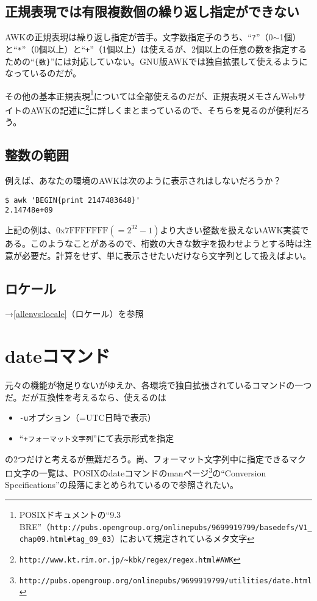 \subsection*{正規表現では有限複数個の繰り返し指定ができない}

AWKの正規表現は繰り返し指定が苦手。文字数指定子のうち、``\verb|?|''（0$\sim$1個）と``\verb|*|''（0個以上）と``\verb|+|''（1個以上）は使えるが、2個以上の任意の数を指定するための``\verb|{数}|''には対応していない。GNU版AWKでは独自拡張して使えるようになっているのだが。

その他の基本正規表現\footnote{POSIXドキュメントの``9.3 BRE''（\verb|http://pubs.opengroup.org/onlinepubs/9699919799/basedefs/V1_chap09.html#tag_09_03|）において規定されているメタ文字}については全部使えるのだが、正規表現メモさんWebサイトのAWKの記述に\footnote{\verb|http://www.kt.rim.or.jp/~kbk/regex/regex.html#AWK|}に詳しくまとまっているので、そちらを見るのが便利だろう。

\subsection*{整数の範囲}

例えば、あなたの環境のAWKは次のように表示されはしないだろうか？

\begin{screen}
	\verb|$ awk 'BEGIN{print 2147483648}'| \return \\
	\verb|2.14748e+09| 
\end{screen}

上記の例は、$\mathrm{0x7FFFFFFF}(=2^{32}-1)$より大きい整数を扱えないAWK実装である。このようなことがあるので、桁数の大きな数字を扱わせようとする時は注意が必要だ。計算をせず、単に表示させたいだけなら文字列として扱えばよい。

\subsection*{ロケール}

\noindent
→\ref{allenvs:locale}（ロケール）を参照

\section{dateコマンド}

元々の機能が物足りないがゆえか、各環境で独自拡張されているコマンドの一つだ。だが互換性を考えるなら、使えるのは

\begin{itemize}
  \item \verb|-u|オプション（=UTC日時で表示）
  \item ``\verb|+フォーマット文字列|''にて表示形式を指定
\end{itemize}
の2つだけと考えるが無難だろう。尚、フォーマット文字列中に指定できるマクロ文字の一覧は、POSIXのdateコマンドのmanページ\footnote{\verb|http://pubs.opengroup.org/onlinepubs/9699919799/utilities/date.html|}の``Conversion Specifications''の段落にまとめられているので参照されたい。

